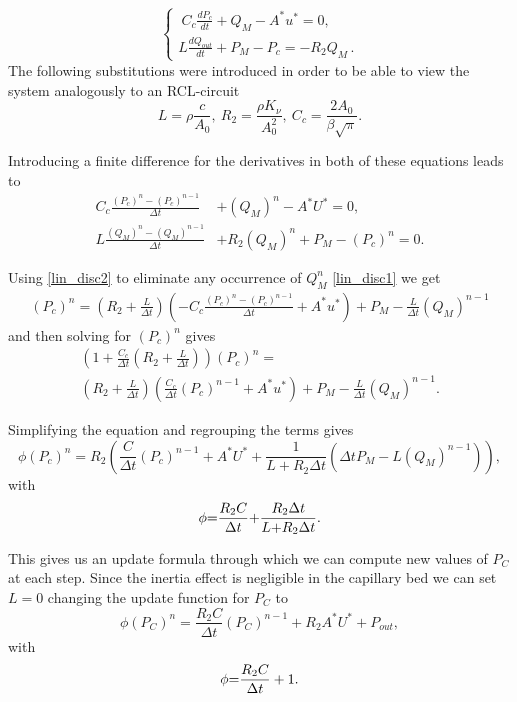 \documentclass[a4paper, oneside]{discothesis}
\begin{document}
\begin{equation}
	\left\{\begin{array}{l}
			\ C_c\frac{d P_{c}}{d t}+Q_{M}-A^*u^*=0,\\
			{L}{\frac{d Q_{out}}{d t}}+P_{M}-P_{c}=-R_2 Q_{M}\,.
	\end{array}\right.
\end{equation}
The following substitutions were introduced in order to be able to view the system analogously to an RCL-circuit
\begin{equation}
	L = \rho \frac{c}{A_0}, \  
	R_2 = \frac{\rho K_\nu}{A_0^2}, \ 
	C_c =\frac{2A_0}{\beta\sqrt{\pi}}. 
\end{equation}

Introducing a finite difference for the derivatives in both of these equations leads to
\begin{align}
	C_c{\frac{(P_{c})^{n}-(P_{c})^{n-1}}{\Delta t}} &+ (Q_M)^{n}-A^{*}U^{*} = 0, \label{lin_disc1}\\ 
	L\frac{(Q_M)^{n}-(Q_M)^{n-1}}{\Delta t} &+ R_{2}(Q_M)^{n}+P_M-(P_{c})^{n} = 0. \label{lin_disc2}
\end{align}

Using \ref{lin_disc2} to eliminate any occurrence of $Q_M^n$ \ref{lin_disc1} we get
\begin{align}
	(P_c)^n = \left(R_2 + \frac{L}{\Delta t}\right) \left( - C_c \frac{(P_c)^n - (P_c)^{n-1}}{\Delta t} + A^*u^*\right)+ P_M - \frac{L}{\Delta t} (Q_M)^{n-1}
\end{align}
and then solving for $(P_c)^n$ gives
\begin{multline}
	\left( 1+ \frac{C_c}{\Delta t}\left( R_2 + \frac{L}{\Delta t} \right) \right) (P_c)^n = \\
	\left( R_2 + \frac{L}{\Delta t} \right) \left( \frac{C_c}{\Delta t} (P_c)^{n-1} + A^*u^* \right) + P_M - \frac{L}{\Delta t} (Q_M)^{n-1}.
\end{multline}

Simplifying the equation and regrouping the terms gives
\begin{equation}
	\phi(P_{c})^{n}=R_2 \left( \frac{C}{\Delta t}(P_{c})^{n-1} + A^{*}U^{*}+\frac{1}{L+R_{2}\Delta t}\left(\Delta t P_M-L(Q_M)^{n-1}\right) \right),
\end{equation}
with 
\begin{equation}
	\phi{\cal=}\frac{R_{2}C}{\Delta t}{\bf+}\frac{R_{2}\Delta t}{L{+}R_{2}\Delta t}. \label{RCL}
\end{equation}

This gives us an update formula through which we can compute new values of $P_C$ at each step.
Since the inertia effect is negligible in the capillary bed we can set $L=0$ changing the update function for $P_C$ to 
\begin{equation}
	\phi(P_{C})^{n}=\frac{R_{2}C}{\Delta t}(P_{C})^{n-1}+R_{2}A^{*}U^{*}+P_{out},
\end{equation}
with 
\begin{equation}
	\phi{\cal=}\frac{R_{2}C}{\Delta t} + 1. 
\end{equation}
\end{document}
